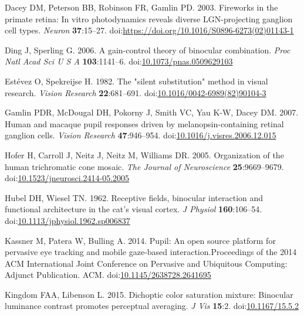 \documentclass[
]{article}
\newlength{\cslhangindent}
\newlength{\cslentryspacingunit} %
\newenvironment{CSLReferences}[2] %
 {%
  \setlength{\parindent}{0pt}
  \ifodd #1
  \let\oldpar\par
  \def\par{\hangindent=\cslhangindent\oldpar}
  \fi
  \setlength{\parskip}{#2\cslentryspacingunit}
 }%
 {}
\begin{document}
\begin{CSLReferences}{1}{0}
\leavevmode{}%
Dacey DM, Peterson BB, Robinson FR, Gamlin PD. 2003. Fireworks in the primate retina: In vitro photodynamics reveals diverse LGN-projecting ganglion cell types. \emph{Neuron} \textbf{37}:15--27. doi:\url{https://doi.org/10.1016/S0896-6273(02)01143-1}

\leavevmode{}%
Ding J, Sperling G. 2006. A gain-control theory of binocular combination. \emph{Proc Natl Acad Sci U S A} \textbf{103}:1141--6. doi:\href{https://doi.org/10.1073/pnas.0509629103}{10.1073/pnas.0509629103}

\leavevmode{}%
Estévez O, Spekreijse H. 1982. The "silent substitution" method in visual research. \emph{Vision Research} \textbf{22}:681--691. doi:\href{https://doi.org/10.1016/0042-6989(82)90104-3}{10.1016/0042-6989(82)90104-3}

\leavevmode{}%
Gamlin PDR, McDougal DH, Pokorny J, Smith VC, Yau K-W, Dacey DM. 2007. Human and macaque pupil responses driven by melanopsin-containing retinal ganglion cells. \emph{Vision Research} \textbf{47}:946--954. doi:\href{https://doi.org/10.1016/j.visres.2006.12.015}{10.1016/j.visres.2006.12.015}

\leavevmode{}%
Hofer H, Carroll J, Neitz J, Neitz M, Williams DR. 2005. Organization of the human trichromatic cone mosaic. \emph{The Journal of Neuroscience} \textbf{25}:9669--9679. doi:\href{https://doi.org/10.1523/jneurosci.2414-05.2005}{10.1523/jneurosci.2414-05.2005}

\leavevmode{}%
Hubel DH, Wiesel TN. 1962. Receptive fields, binocular interaction and functional architecture in the cat's visual cortex. \emph{J Physiol} \textbf{160}:106--54. doi:\href{https://doi.org/10.1113/jphysiol.1962.sp006837}{10.1113/jphysiol.1962.sp006837}

\leavevmode{}%
Kassner M, Patera W, Bulling A. 2014. Pupil: An open source platform for pervasive eye tracking and mobile gaze-based interaction.Proceedings of the 2014 {ACM} International Joint Conference on Pervasive and Ubiquitous Computing: Adjunct Publication. {ACM}. doi:\href{https://doi.org/10.1145/2638728.2641695}{10.1145/2638728.2641695}

\leavevmode{}%
Kingdom FAA, Libenson L. 2015. Dichoptic color saturation mixture: Binocular luminance contrast promotes perceptual averaging. \emph{J Vis} \textbf{15}:2. doi:\href{https://doi.org/10.1167/15.5.2}{10.1167/15.5.2}


\end{CSLReferences}
\end{document}
